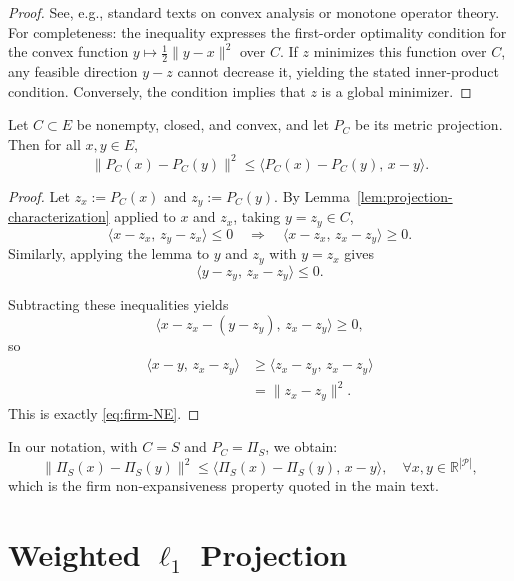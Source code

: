 \documentclass[11pt]{article}
\begin{document}
\begin{proof}
See, e.g., standard texts on convex analysis or monotone operator theory. For completeness: the inequality expresses the first-order optimality condition for the convex function $y\mapsto \tfrac12\|y-x\|^2$ over $C$. If $z$ minimizes this function over $C$, any feasible direction $y-z$ cannot decrease it, yielding the stated inner-product condition. Conversely, the condition implies that $z$ is a global minimizer.
\end{proof}

\begin{theorem}\label{thm:firmly-nonexpansive}
Let $C\subset E$ be nonempty, closed, and convex, and let $P_C$ be its metric projection. Then for all $x,y\in E$,
\begin{equation}
  \|P_C(x) - P_C(y)\|^2
  \le \langle P_C(x)-P_C(y),\, x-y\rangle.
  \label{eq:firm-NE}
\end{equation}
\end{theorem}

\begin{proof}
Let $z_x:=P_C(x)$ and $z_y:=P_C(y)$. By Lemma~\ref{lem:projection-characterization} applied to $x$ and $z_x$, taking $y=z_y\in C$,
\[
\langle x - z_x,\, z_y - z_x\rangle \le 0
\quad\Longrightarrow\quad
\langle x - z_x,\, z_x - z_y\rangle \ge 0.
\]
Similarly, applying the lemma to $y$ and $z_y$ with $y=z_x$ gives
\[
\langle y - z_y,\, z_x - z_y\rangle \le 0.
\]

Subtracting these inequalities yields
\[
\langle x - z_x - (y - z_y),\, z_x - z_y\rangle \ge 0,
\]
so
\begin{align*}
\langle x-y,\, z_x - z_y\rangle
&\ge \langle z_x - z_y,\, z_x - z_y\rangle\\
&= \|z_x - z_y\|^2.
\end{align*}
This is exactly \eqref{eq:firm-NE}.
\end{proof}

In our notation, with $C=S$ and $P_C=\Pi_S$, we obtain:
\begin{equation}
  \|\Pi_S(x) - \Pi_S(y)\|^2
  \le \langle \Pi_S(x)-\Pi_S(y),\, x-y\rangle,\quad \forall x,y\in\mathbb R^{|\mathcal P|},
\end{equation}
which is the firm non-expansiveness property quoted in the main text.

\section{Weighted \texorpdfstring{$\ell_1$}{l1} Projection}
\end{document}
